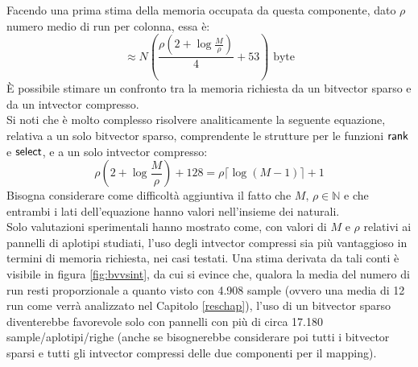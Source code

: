 Facendo una prima stima della memoria occupata da questa componente,
dato $\rho$ numero medio di run per colonna, essa è:
\begin{equation}
  \label{eq:mapintmem2}
  \approx N\left(\frac{\rho\left(2+\log\frac{M}{\rho}\right)}{4}+
    53\right)\mbox{ byte} 
\end{equation}
È possibile stimare un confronto tra la memoria
richiesta da un bitvector sparso e da un intvector compresso.\\
Si noti che è molto complesso risolvere analiticamente la seguente equazione,
relativa a un solo bitvector sparso, comprendente le strutture per
le funzioni $\mbox{\rm {\sf rank}}$ e $\mbox{\rm {\sf select}}$, e a un solo intvector
compresso: 
\begin{equation}
  \label{eq:mapbvintmem}
  \rho\left(2+\log\frac{M}{\rho}\right)+128=\rho\lceil\log(M-1)\rceil+1
\end{equation}
Bisogna considerare come difficoltà aggiuntiva il fatto che $M,\,\rho\in
\mathbb{N}$ e che entrambi i lati dell'equazione hanno valori nell'insieme dei
naturali.\\
Solo valutazioni sperimentali hanno mostrato come, con valori di $M$ e $\rho$
relativi ai pannelli di aplotipi studiati, l'uso degli intvector compressi sia
più vantaggioso in termini di memoria richiesta, nei casi testati. Una stima
derivata da tali 
conti è visibile in figura \ref{fig:bvvsint}, da cui si evince che, qualora la
media del numero di run resti proporzionale a quanto visto con 4.908 sample
(ovvero una media di 12 run come verrà
analizzato nel Capitolo \ref{reschap}), l'uso di un
bitvector sparso diventerebbe favorevole solo con pannelli con più di circa
17.180 sample/aplotipi/righe (anche se bisognerebbe considerare poi tutti i
bitvector sparsi e tutti gli intvector compressi delle due componenti per il
mapping).  
